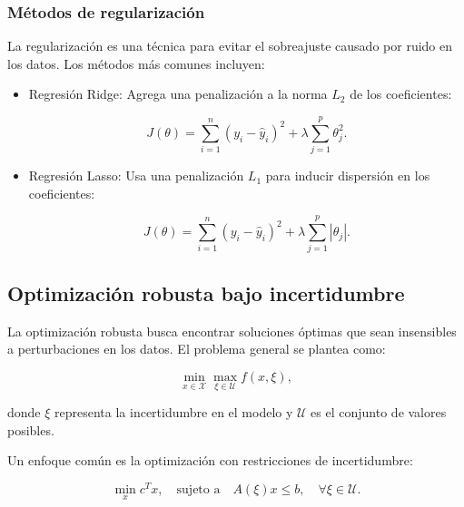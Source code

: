 \begin{itemize}
		\subsubsection{Métodos de regularización}
		
		La regularización es una técnica para evitar el sobreajuste causado por ruido en los datos. Los métodos más comunes incluyen:
		
		\begin{itemize}
			\item Regresión Ridge: Agrega una penalización a la norma \( L_2 \) de los coeficientes:
			
			\begin{equation}
				J(\theta) = \sum_{i=1}^{n} (y_i - \hat{y}_i)^2 + \lambda \sum_{j=1}^{p} \theta_j^2.
			\end{equation}
			
			\item Regresión Lasso: Usa una penalización \( L_1 \) para inducir dispersión en los coeficientes:
			
			\begin{equation}
				J(\theta) = \sum_{i=1}^{n} (y_i - \hat{y}_i)^2 + \lambda \sum_{j=1}^{p} |\theta_j|.
			\end{equation}
		\end{itemize}
		
		\subsection{Optimización robusta bajo incertidumbre}
		
		La optimización robusta busca encontrar soluciones óptimas que sean insensibles a perturbaciones en los datos. El problema general se plantea como:
		
		\begin{equation}
			\min_{x \in \mathcal{X}} \max_{\xi \in \mathcal{U}} f(x, \xi),
		\end{equation}
		
		donde \( \xi \) representa la incertidumbre en el modelo y \( \mathcal{U} \) es el conjunto de valores posibles.
		
		Un enfoque común es la optimización con restricciones de incertidumbre:
		
		\begin{equation}
			\min_x c^T x, \quad \text{sujeto a} \quad A(\xi) x \leq b, \quad \forall \xi \in \mathcal{U}.
		\end{equation}
		

\end{itemize}
